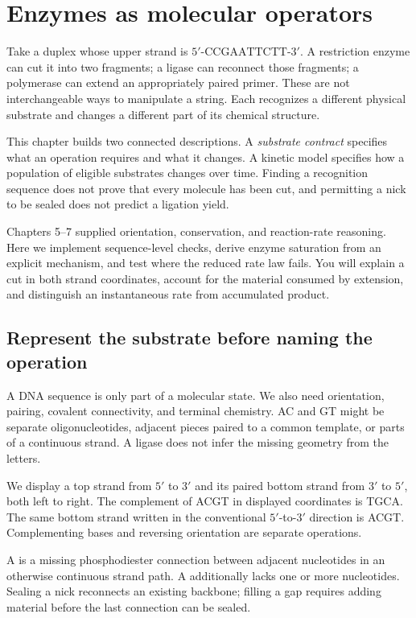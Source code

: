 \chapter{Enzymes as molecular operators}
\label{ch:enzymes}

Take a duplex whose upper strand is $5'\text{-CCGAATTCTT-}3'$. A restriction enzyme can cut it into two fragments; a ligase can reconnect those fragments; a polymerase can extend an appropriately paired primer. These are not interchangeable ways to manipulate a string. Each recognizes a different physical substrate and changes a different part of its chemical structure.

This chapter builds two connected descriptions. A \emph{substrate contract} specifies what an operation requires and what it changes. A kinetic model specifies how a population of eligible substrates changes over time. Finding a recognition sequence does not prove that every molecule has been cut, and permitting a nick to be sealed does not predict a ligation yield.

Chapters 5--7 supplied orientation, conservation, and reaction-rate reasoning. Here we implement sequence-level checks, derive enzyme saturation from an explicit mechanism, and test where the reduced rate law fails. You will explain a cut in both strand coordinates, account for the material consumed by extension, and distinguish an instantaneous rate from accumulated product.

\section{Represent the substrate before naming the operation}

A DNA sequence is only part of a molecular state. We also need orientation, pairing, covalent connectivity, and terminal chemistry. AC and GT might be separate oligonucleotides, adjacent pieces paired to a common template, or parts of a continuous strand. A ligase does not infer the missing geometry from the letters.

We display a top strand from $5'$ to $3'$ and its paired bottom strand from $3'$ to $5'$, both left to right. The complement of ACGT in displayed coordinates is TGCA. The same bottom strand written in the conventional $5'$-to-$3'$ direction is ACGT. Complementing bases and reversing orientation are separate operations.

A  is a missing phosphodiester connection between adjacent nucleotides in an otherwise continuous strand path. A  additionally lacks one or more nucleotides. Sealing a nick reconnects an existing backbone; filling a gap requires adding material before the last connection can be sealed.

